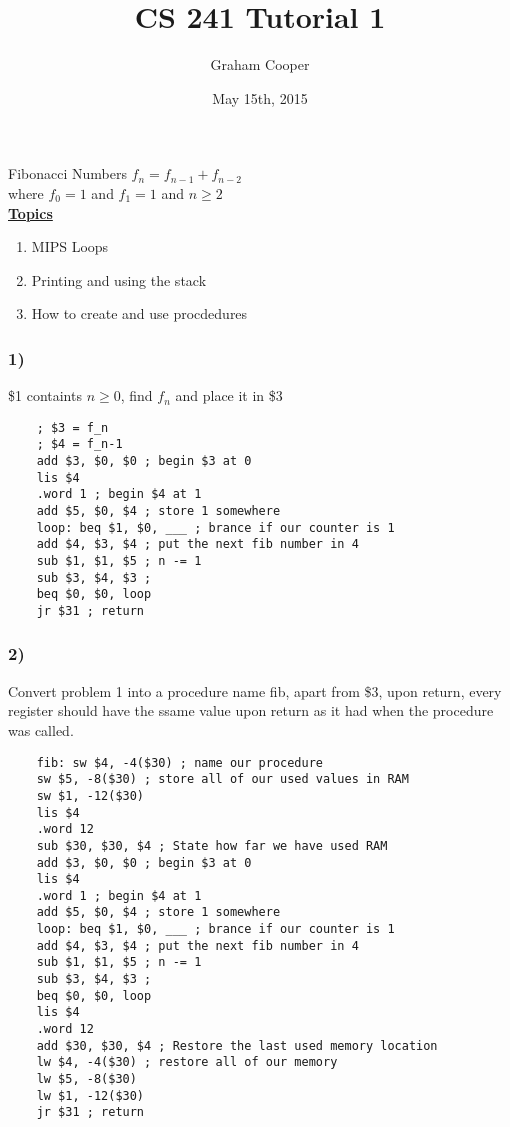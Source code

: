 \documentclass[12pt]{article}
\title{\vspace{-15ex}CS 241 Tutorial 1\vspace{-1ex}}
\date{May 15th, 2015}
\author{Graham Cooper}
\newcommand{\myt}[1]{\textbf{\underline{#1}}}
\begin{document}
	\maketitle
	
	Fibonacci Numbers $f_n = f_{n-1} + f_{n-2}$\\
	where $f_0 = 1$ and $f_1 = 1$ and $n \geq 2$\\
	
	\myt{Topics}
	\begin{enumerate}
		\item MIPS Loops
		\item Printing and using the stack
		\item How to create and use procdedures
	\end{enumerate}
	
	\subsubsection*{1)}
	\$1 containts $n \geq 0$, find $f_n$ and place it in \$3
	
	\lstset{language=[mips]Assembler}
	\begin{lstlisting}
	; $3 = f_n
	; $4 = f_n-1
	add $3, $0, $0 ; begin $3 at 0
	lis $4
	.word 1 ; begin $4 at 1
	add $5, $0, $4 ; store 1 somewhere
	loop: beq $1, $0, ___ ; brance if our counter is 1
	add $4, $3, $4 ; put the next fib number in 4
	sub $1, $1, $5 ; n -= 1
	sub $3, $4, $3 ; 
	beq $0, $0, loop
	jr $31 ; return
	\end{lstlisting}
	
	\subsubsection*{2)}
	Convert problem 1 into a procedure name fib, apart from \$3, upon return, every register should have the ssame value upon return as it had when the procedure was called.\\
	
	\begin{lstlisting}
	fib: sw $4, -4($30) ; name our procedure
	sw $5, -8($30) ; store all of our used values in RAM
	sw $1, -12($30)
	lis $4
	.word 12
	sub $30, $30, $4 ; State how far we have used RAM
	add $3, $0, $0 ; begin $3 at 0
	lis $4
	.word 1 ; begin $4 at 1
	add $5, $0, $4 ; store 1 somewhere
	loop: beq $1, $0, ___ ; brance if our counter is 1
	add $4, $3, $4 ; put the next fib number in 4
	sub $1, $1, $5 ; n -= 1
	sub $3, $4, $3 ; 
	beq $0, $0, loop
	lis $4
	.word 12
	add $30, $30, $4 ; Restore the last used memory location
	lw $4, -4($30) ; restore all of our memory
	lw $5, -8($30)
	lw $1, -12($30)
	jr $31 ; return
	\end{lstlisting}
	
\end{document}

